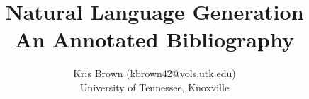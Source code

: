\documentclass [11pt]{article}
\title{Natural Language Generation\\\medskip An Annotated Bibliography}
\author{Kris Brown (kbrown42@vols.utk.edu)\\
University of Tennessee, Knoxville}
\begin{document}
\maketitle
\nocite{*}


\end{document}
